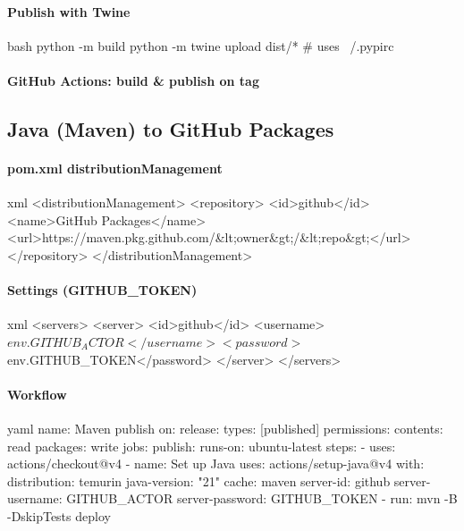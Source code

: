 \documentclass[11pt]{article}
\begin{document}
\paragraph{Publish with Twine}
\begin{code}{bash}
python -m build
python -m twine upload dist/*     # uses ~/.pypirc
\end{code}
\clearpage

\paragraph{GitHub Actions: build \& publish on tag}

\subsection{Java (Maven) to GitHub Packages}
\paragraph{pom.xml distributionManagement}
\begin{code}{xml}
<distributionManagement>
  <repository>
    <id>github</id>
    <name>GitHub Packages</name>
    <url>https://maven.pkg.github.com/&lt;owner&gt;/&lt;repo&gt;</url>
  </repository>
</distributionManagement>
\end{code}

\paragraph{Settings (GITHUB\_TOKEN)}
\begin{code}{xml}
<servers>
  <server>
    <id>github</id>
    <username>${env.GITHUB_ACTOR}</username>
    <password>${env.GITHUB_TOKEN}</password>
  </server>
</servers>
\end{code}
\clearpage

\paragraph{Workflow}
\begin{code}{yaml}
name: Maven publish
on:
  release:
    types: [published]
permissions:
  contents: read
  packages: write
jobs:
  publish:
    runs-on: ubuntu-latest
    steps:
      - uses: actions/checkout@v4
      - name: Set up Java
        uses: actions/setup-java@v4
        with:
          distribution: temurin
          java-version: "21"
          cache: maven
          server-id: github
          server-username: GITHUB_ACTOR
          server-password: GITHUB_TOKEN
      - run: mvn -B -DskipTests deploy
\end{code}
\end{document}
